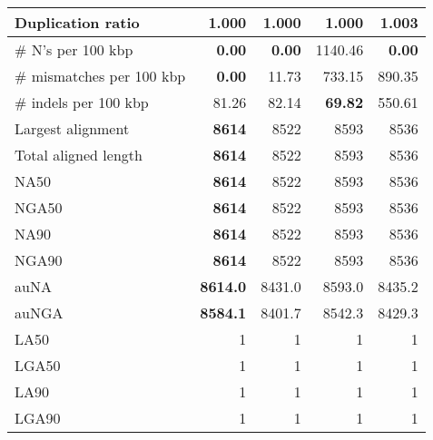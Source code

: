 \documentclass[12pt,a4paper]{article}
\begin{document}
\begin{table}[ht]
\begin{center}
\begin{tabular}{|l*{4}{|r}|}
Duplication ratio & {\bf 1.000} & {\bf 1.000} & {\bf 1.000} & 1.003 \\ \hline
\# N's per 100 kbp & {\bf 0.00} & {\bf 0.00} & 1140.46 & {\bf 0.00} \\ \hline
\# mismatches per 100 kbp & {\bf 0.00} & 11.73 & 733.15 & 890.35 \\ \hline
\# indels per 100 kbp & 81.26 & 82.14 & {\bf 69.82} & 550.61 \\ \hline
Largest alignment & {\bf 8614} & 8522 & 8593 & 8536 \\ \hline
Total aligned length & {\bf 8614} & 8522 & 8593 & 8536 \\ \hline
NA50 & {\bf 8614} & 8522 & 8593 & 8536 \\ \hline
NGA50 & {\bf 8614} & 8522 & 8593 & 8536 \\ \hline
NA90 & {\bf 8614} & 8522 & 8593 & 8536 \\ \hline
NGA90 & {\bf 8614} & 8522 & 8593 & 8536 \\ \hline
auNA & {\bf 8614.0} & 8431.0 & 8593.0 & 8435.2 \\ \hline
auNGA & {\bf 8584.1} & 8401.7 & 8542.3 & 8429.3 \\ \hline
LA50 & 1 & 1 & 1 & 1 \\ \hline
LGA50 & 1 & 1 & 1 & 1 \\ \hline
LA90 & 1 & 1 & 1 & 1 \\ \hline
LGA90 & 1 & 1 & 1 & 1 \\ \hline
\end{tabular}
\end{center}
\end{table}
\end{document}
